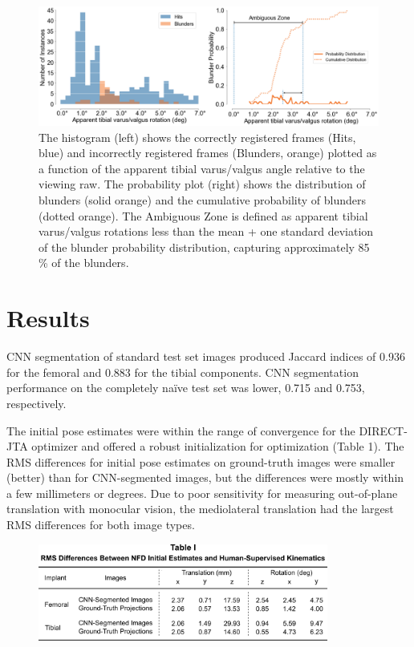 \begin{figure}[hb]
    \centering
    \includegraphics[width = \linewidth]{figs/jtml-paper/fig5-histo.png}
    \caption{The histogram (left) shows the correctly registered frames (Hits, blue) and incorrectly registered frames  (Blunders, orange) plotted as a function of the apparent tibial varus/valgus angle relative to the viewing raw. The probability plot (right) shows the distribution of blunders (solid orange) and the cumulative probability of blunders (dotted orange). The Ambiguous Zone is defined as apparent tibial varus/valgus rotations less than the mean + one standard deviation of the blunder probability distribution, capturing approximately 85 \% of the blunders.}
    \label{fig:histo-pdf}
\end{figure}


\section{Results}
CNN segmentation of standard test set images produced Jaccard indices of 0.936 for the femoral and 0.883 for the tibial components. CNN segmentation performance on the completely naïve test set was lower, 0.715 and 0.753, respectively.

The initial pose estimates were within the range of convergence for the DIRECT-JTA optimizer and offered a robust initialization for optimization (Table 1). The RMS differences for initial pose estimates on ground-truth images were smaller (better) than for CNN-segmented images, but the differences were mostly within a few millimeters or degrees. Due to poor sensitivity for measuring out-of-plane translation with monocular vision, the mediolateral translation had the largest RMS differences for both image types.



\begin{figure}[ht]
    \centering
    \includegraphics[width = 0.85\textwidth]{figs/jtml-paper/tab1-nfd-performance.png}
\end{figure}

